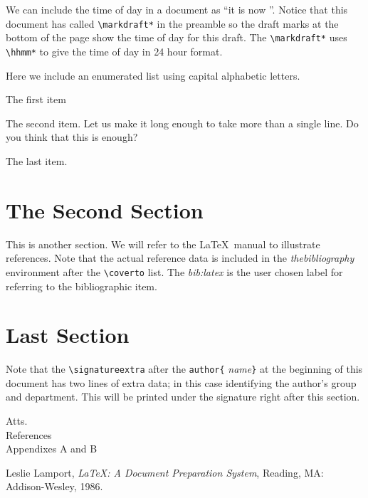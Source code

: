 We can include the time of day in a document as ``it is now \hhmm''.
Notice that this document has called \verb|\markdraft*| in the
preamble so the draft marks at the bottom of the page show the time of
day for this draft.  The \verb|\markdraft*| uses \verb|\hhmm*| to give
the time of day in 24 hour format.

Here we include an enumerated list using capital alphabetic letters.
\begin{Alphenum}
\item The first item
\item The second item.  Let us make it long enough to 
take more than a single line.  Do you think that this is enough?
\item The last item.
\end{Alphenum}
\section{The Second Section}
This is another section.  We will refer to the \LaTeX\ manual to
illustrate references.\cite{bib:latex}  Note that the actual
reference data is included in the {\it thebibliography} environment
after the \verb|\coverto| list.  The {\it bib:latex} is the user
chosen label for referring to the bibliographic item.

\section{Last Section}
Note that the \verb|\signatureextra| after the \verb|author{|{\it
name}\verb|}| at the beginning of this document has two lines of
extra data; in this case identifying the author's group and
department.  This will be printed under the signature right after
this section.
\makesignature

\noindent Atts.\\
References\\
Appendixes A and B

\medskip
{}
\begin{thebibliography}{99}

Leslie Lamport, {\it \LaTeX : A Document
Preparation System}, Reading, MA: Addison-Wesley, 1986.
\end{thebibliography}
\appendices
